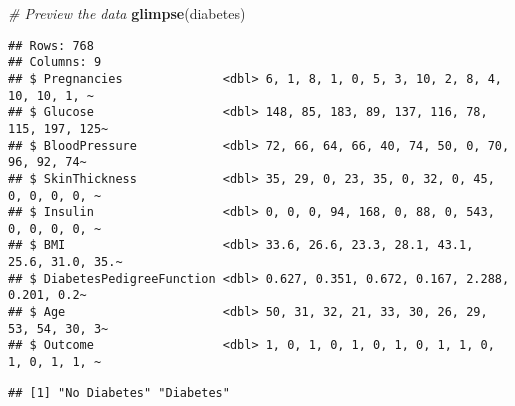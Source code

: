 \documentclass[
]{article}
\newenvironment{Shaded}{\begin{snugshade}}{\end{snugshade}}
\newcommand{\AttributeTok}[1]{\textcolor[rgb]{0.13,0.29,0.53}{#1}}
\newcommand{\CommentTok}[1]{\textcolor[rgb]{0.56,0.35,0.01}{\textit{#1}}}
\newcommand{\DecValTok}[1]{\textcolor[rgb]{0.00,0.00,0.81}{#1}}
\newcommand{\FunctionTok}[1]{\textcolor[rgb]{0.13,0.29,0.53}{\textbf{#1}}}
\newcommand{\NormalTok}[1]{#1}
\newcommand{\OtherTok}[1]{\textcolor[rgb]{0.56,0.35,0.01}{#1}}
\newcommand{\SpecialCharTok}[1]{\textcolor[rgb]{0.81,0.36,0.00}{\textbf{#1}}}
\newcommand{\StringTok}[1]{\textcolor[rgb]{0.31,0.60,0.02}{#1}}
\begin{document}
\begin{Shaded}
\begin{Highlighting}[]
\CommentTok{\# Preview the data}
\FunctionTok{glimpse}\NormalTok{(diabetes)}
\end{Highlighting}
\end{Shaded}

\begin{verbatim}
## Rows: 768
## Columns: 9
## $ Pregnancies              <dbl> 6, 1, 8, 1, 0, 5, 3, 10, 2, 8, 4, 10, 10, 1, ~
## $ Glucose                  <dbl> 148, 85, 183, 89, 137, 116, 78, 115, 197, 125~
## $ BloodPressure            <dbl> 72, 66, 64, 66, 40, 74, 50, 0, 70, 96, 92, 74~
## $ SkinThickness            <dbl> 35, 29, 0, 23, 35, 0, 32, 0, 45, 0, 0, 0, 0, ~
## $ Insulin                  <dbl> 0, 0, 0, 94, 168, 0, 88, 0, 543, 0, 0, 0, 0, ~
## $ BMI                      <dbl> 33.6, 26.6, 23.3, 28.1, 43.1, 25.6, 31.0, 35.~
## $ DiabetesPedigreeFunction <dbl> 0.627, 0.351, 0.672, 0.167, 2.288, 0.201, 0.2~
## $ Age                      <dbl> 50, 31, 32, 21, 33, 30, 26, 29, 53, 54, 30, 3~
## $ Outcome                  <dbl> 1, 0, 1, 0, 1, 0, 1, 0, 1, 1, 0, 1, 0, 1, 1, ~
\end{verbatim}

\begin{Shaded}
\end{Shaded}

\begin{verbatim}
## [1] "No Diabetes" "Diabetes"
\end{verbatim}

\begin{Shaded}
\end{Shaded}
\end{document}
